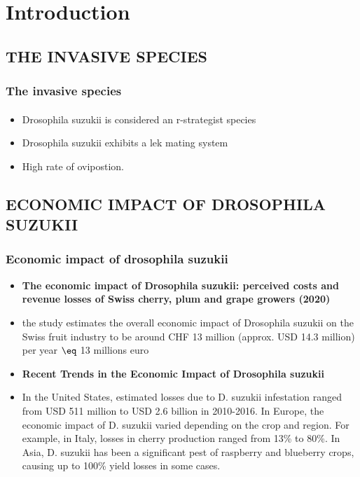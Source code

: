 \documentclass[light]{lutbeamer} %
\begin{document}
\section{Introduction}
\subsection{THE INVASIVE SPECIES}
\begin{frame}
\frametitle{The invasive species}
\framesubtitle{}
\begin{itemize}
\item Drosophila suzukii is considered an r-strategist species

\item Drosophila suzukii exhibits a lek mating system
\item High rate of ovipostion.
\end{itemize}
\end{frame}

\begin{frame}
\subsection{ECONOMIC IMPACT OF DROSOPHILA SUZUKII}
\frametitle{Economic impact of drosophila suzukii}

\begin{itemize}
\item \textbf{The economic impact of Drosophila suzukii: perceived costs and revenue losses of Swiss cherry, plum and grape growers (2020)}
\item the study estimates the overall economic impact of Drosophila suzukii on the Swiss fruit industry to be around CHF 13 million (approx. USD 14.3 million) per year $\eq$ 13 millions euro
\item \textbf{Recent Trends in the Economic Impact of Drosophila suzukii}
\item In the United States, estimated losses due to D. suzukii infestation ranged from USD 511 million to USD 2.6 billion in 2010-2016.
In Europe, the economic impact of D. suzukii varied depending on the crop and region. For example, in Italy, losses in cherry production ranged from 13\% to 80\%.
In Asia, D. suzukii has been a significant pest of raspberry and blueberry crops, causing up to 100\% yield losses in some cases.

\end{itemize}
\end{frame}
\end{document}
